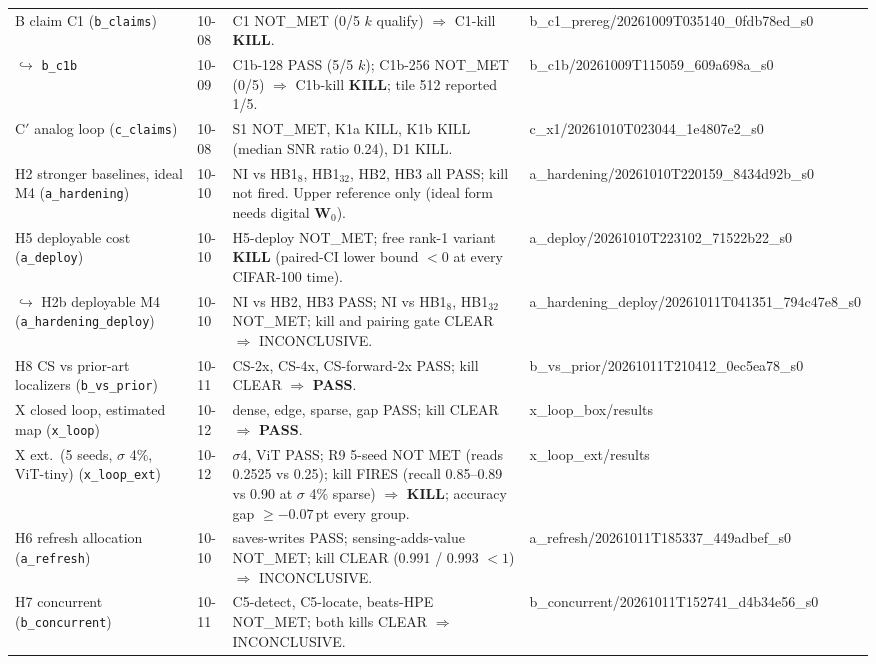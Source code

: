 \documentclass[journal]{IEEEtran}
\newcommand{\mfour}{\textsc{M4}}
\newcommand{\W}{\mathbf{W}}
\begin{document}
\begin{table}[t]
\begin{tabular}{p{2.6cm}p{1.5cm}p{9.2cm}p{2.9cm}}
B claim C1 (\texttt{b\_claims}) & 10-08 & C1 NOT\_MET (0/5 $k$ qualify) $\Rightarrow$ C1-kill \textbf{KILL}. & b\_c1\_prereg/\allowbreak 20261009T035140\_0fdb78ed\_s0 \\
\quad $\hookrightarrow$ \texttt{b\_c1b} & 10-09 & C1b-128 PASS (5/5 $k$); C1b-256 NOT\_MET (0/5) $\Rightarrow$ C1b-kill \textbf{KILL}; tile 512 reported 1/5. & b\_c1b/\allowbreak 20261009T115059\_609a698a\_s0 \\
C$'$ analog loop (\texttt{c\_claims}) & 10-08 & S1 NOT\_MET, K1a KILL, K1b KILL (median SNR ratio 0.24), D1 KILL. & c\_x1/\allowbreak 20261010T023044\_1e4807e2\_s0 \\
H2 stronger baselines, ideal \mfour{} (\texttt{a\_hardening}) & 10-10 & NI vs HB1$_8$, HB1$_{32}$, HB2, HB3 all PASS; kill not fired. Upper reference only (ideal form needs digital $\W_0$). & a\_hardening/\allowbreak 20261010T220159\_8434d92b\_s0 \\
H5 deployable cost (\texttt{a\_deploy}) & 10-10 & H5-deploy NOT\_MET; free rank-1 variant \textbf{KILL} (paired-CI lower bound $<0$ at every CIFAR-100 time). & a\_deploy/\allowbreak 20261010T223102\_71522b22\_s0 \\
\quad $\hookrightarrow$ H2b deployable \mfour{} (\texttt{a\_hardening\_deploy}) & 10-10 & NI vs HB2, HB3 PASS; NI vs HB1$_8$, HB1$_{32}$ NOT\_MET; kill and pairing gate CLEAR $\Rightarrow$ INCONCLUSIVE. & a\_hardening\_deploy/\allowbreak 20261011T041351\_794c47e8\_s0 \\
H8 CS vs prior-art localizers (\texttt{b\_vs\_prior}) & 10-11 & CS-2x, CS-4x, CS-forward-2x PASS; kill CLEAR $\Rightarrow$ \textbf{PASS}. & b\_vs\_prior/\allowbreak 20261011T210412\_0ec5ea78\_s0 \\
X closed loop, estimated map (\texttt{x\_loop}) & 10-12 & dense, edge, sparse, gap PASS; kill CLEAR $\Rightarrow$ \textbf{PASS}. & x\_loop\_box/results \\
X ext.\ (5 seeds, $\sigma$ 4\%, ViT-tiny) (\texttt{x\_loop\_ext}) & 10-12 & $\sigma$4, ViT PASS; R9 5-seed NOT MET (reads 0.2525 vs 0.25); kill FIRES (recall 0.85--0.89 vs 0.90 at $\sigma$ 4\% sparse) $\Rightarrow$ \textbf{KILL}; accuracy gap $\geq -0.07$\,pt every group. & x\_loop\_ext/results \\
H6 refresh allocation (\texttt{a\_refresh}) & 10-10 & saves-writes PASS; sensing-adds-value NOT\_MET; kill CLEAR (0.991 / 0.993 $<1$) $\Rightarrow$ INCONCLUSIVE. & a\_refresh/\allowbreak 20261011T185337\_449adbef\_s0 \\
H7 concurrent (\texttt{b\_concurrent}) & 10-11 & C5-detect, C5-locate, beats-HPE NOT\_MET; both kills CLEAR $\Rightarrow$ INCONCLUSIVE. & b\_concurrent/\allowbreak 20261011T152741\_d4b34e56\_s0 \\

\end{tabular}
\end{table}
\end{document}
